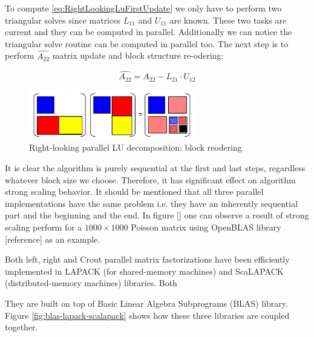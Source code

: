 To compute \ref{eq:RightLookingLuFirstUpdate} we only have to perform two triangular solves since matrices $L_{11}$ and $U_{11}$ are known. These two tasks are current and they can be computed in parallel. Additionally we can notice the triangular solve routine can be computed in parallel too. The next step is to perform $\hat{A_{22}}$ matrix update and block structure re-odering:

\begin{equation} \label{eq:RightLookingLuSecondUpdate}
\hat{A_{22}} = A_{22} - L_{21} \cdot U_{12}
\end{equation}


\begin{figure}[htpb]
  \centering
  \includegraphics[width=0.65\textwidth]{figures/chapter-2/right-looking-reodering.png}
\caption{Right-looking parallel LU decomposition: block reodering \cite{netlib:lapack-scalapack-general-view}}
\label{fig:RightLookingLuReodering}
\end{figure}


It is clear the algorithm is purely sequential at the first and last steps, regardless whatever block size we choose. Therefore, it has significant effect on algorithm strong scaling behavior. It should be mentioned that all three parallel implementations have the same problem i.e. they have an inherently sequential part and the beginning and the end. In figure [] one can observe a result of strong scaling perform for a $1000 \times 1000$ Poisson matrix using OpenBLAS library [reference] as an example.


Both left, right and Crout parallel matrix factorizations have been efficiently implemented in LAPACK (for shared-memory machines) and ScaLAPACK (distributed-memory machines) libraries. Both 

They are built on top of Basic Linear Algebra Subprograms (BLAS) library. Figure \ref{fig:blas-lapack-scalapack} shows how these three libraries are coupled together.


